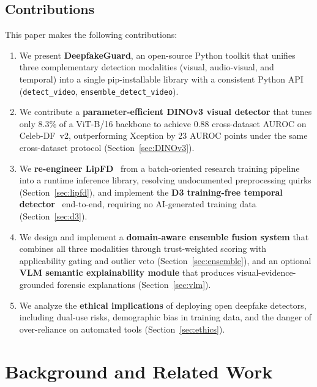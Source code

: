 \documentclass[conference]{IEEEtran}
\begin{document}
\subsection{Contributions}
This paper makes the following contributions:
\begin{enumerate}[leftmargin=*]
    \item We present \textbf{DeepfakeGuard}, an open-source Python toolkit that unifies three complementary detection modalities (visual, audio-visual, and temporal) into a single pip-installable library with a consistent Python API (\texttt{detect\_video}, \texttt{ensemble\_detect\_video}).
    \item We contribute a \textbf{parameter-efficient DINOv3 visual detector} that tunes only 8.3\% of a ViT-B/16 backbone to achieve 0.88 cross-dataset AUROC on Celeb-DF~v2, outperforming Xception by 23 AUROC points under the same cross-dataset protocol (Section~\ref{sec:DINOv3}).
    \item We \textbf{re-engineer LipFD}~\cite{lipfd2024} from a batch-oriented research training pipeline into a runtime inference library, resolving undocumented preprocessing quirks (Section~\ref{sec:lipfd}), and implement the \textbf{D3 training-free temporal detector}~\cite{zheng2025d3} end-to-end, requiring no AI-generated training data (Section~\ref{sec:d3}).
    \item We design and implement a \textbf{domain-aware ensemble fusion system} that combines all three modalities through trust-weighted scoring with applicability gating and outlier veto (Section~\ref{sec:ensemble}), and an optional \textbf{VLM semantic explainability module} that produces visual-evidence-grounded forensic explanations (Section~\ref{sec:vlm}).
    \item We analyze the \textbf{ethical implications} of deploying open deepfake detectors, including dual-use risks, demographic bias in training data, and the danger of over-reliance on automated tools (Section~\ref{sec:ethics}).
\end{enumerate}


\section{Background and Related Work}
\end{document}
